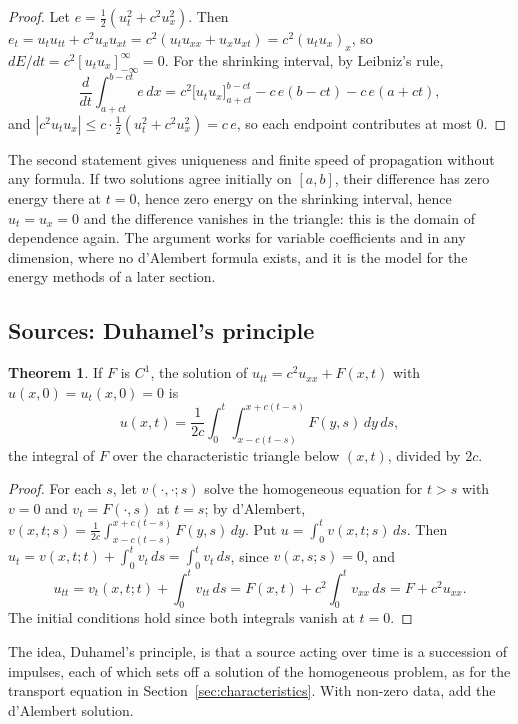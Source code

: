 \documentclass[11pt,a4paper]{article}
\numberwithin{equation}{section}
\theoremstyle{definition}
\newtheorem{thm}{Theorem}[subsection]
\begin{document}
\begin{proof}
Let $e = \frac12(u_t^2 + c^2u_x^2)$. Then $e_t = u_tu_{tt} + c^2u_xu_{xt} = c^2(u_tu_{xx} + u_xu_{xt}) = c^2(u_tu_x)_x$, so $dE/dt = c^2[u_tu_x]_{-\infty}^\infty = 0$. For the shrinking interval, by Leibniz's rule,
\[
\frac{d}{dt}\int_{a + ct}^{b - ct}e\,dx = c^2\bigl[u_tu_x\bigr]_{a + ct}^{b - ct} - c\,e(b - ct) - c\,e(a + ct) ,
\]
and $|c^2u_tu_x| \leq c\cdot\frac12(u_t^2 + c^2u_x^2) = c\,e$, so each endpoint contributes at most $0$.
\end{proof}

The second statement gives uniqueness and finite speed of propagation without any formula. If two solutions agree initially on $[a, b]$, their difference has zero energy there at $t = 0$, hence zero energy on the shrinking interval, hence $u_t = u_x = 0$ and the difference vanishes in the
triangle: this is the domain of dependence again. The argument works for variable coefficients and in any dimension, where no d'Alembert formula exists, and it is the model for the energy methods of a later section.

\subsection{Sources: Duhamel's principle}
\label{ssec:duhamel1d}

\begin{thm}
\label{thm:duhamel1d}
If $F$ is $C^1$, the solution of $u_{tt} = c^2u_{xx} + F(x, t)$ with $u(x, 0) = u_t(x, 0) = 0$ is
\[
u(x, t) = \frac1{2c}\int_0^t\!\!\int_{x - c(t - s)}^{x + c(t - s)}F(y, s)\,dy\,ds ,
\]
the integral of $F$ over the characteristic triangle below $(x, t)$, divided by $2c$.
\end{thm}

\begin{proof}
For each $s$, let $v(\cdot, \cdot; s)$ solve the homogeneous equation for $t > s$ with $v = 0$ and $v_t = F(\cdot, s)$ at $t = s$; by d'Alembert, $v(x, t; s) = \frac1{2c}\int_{x - c(t - s)}^{x + c(t - s)}F(y, s)\,dy$. Put $u = \int_0^tv(x, t; s)\,ds$. Then $u_t = v(x, t; t) + \int_0^tv_t\,ds = \int_0^tv_t\,ds$, since $v(x, s; s) = 0$, and
\[
u_{tt} = v_t(x, t; t) + \int_0^tv_{tt}\,ds = F(x, t) + c^2\int_0^tv_{xx}\,ds = F + c^2u_{xx} .
\]
The initial conditions hold since both integrals vanish at $t = 0$.
\end{proof}

The idea, Duhamel's principle, is that a source acting over time is a succession of impulses, each of which sets off a solution of the homogeneous problem, as for the transport equation in Section~\ref{sec:characteristics}. With non-zero data, add the d'Alembert solution.
\end{document}
